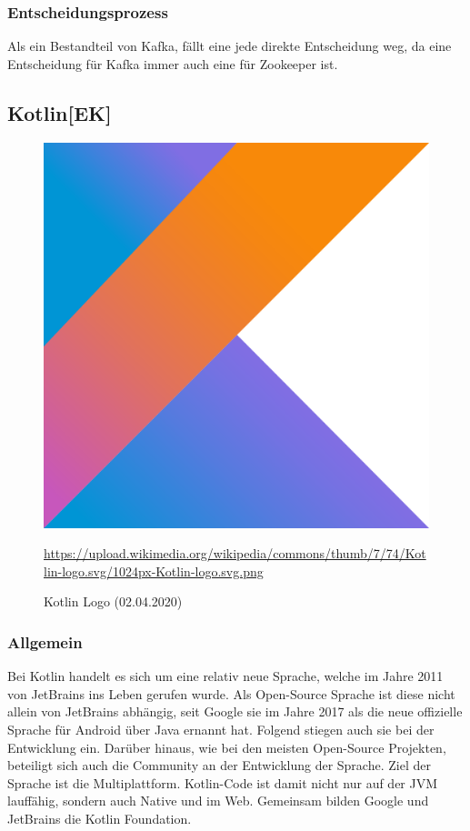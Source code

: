 \subsubsection{Entscheidungsprozess}
Als ein Bestandteil von Kafka, fällt eine jede direkte Entscheidung weg, da eine Entscheidung für Kafka immer auch eine für Zookeeper ist.

\subsection{Kotlin[EK]}
\begin{figure}[H]
    \centering
    \includegraphics[scale=0.1]{images/kotlin-logo.png}
    \caption{Kotlin Logo (02.04.2020)}
    \url{https://upload.wikimedia.org/wikipedia/commons/thumb/7/74/Kotlin-logo.svg/1024px-Kotlin-logo.svg.png}
\end{figure}
\subsubsection{Allgemein}
Bei Kotlin handelt es sich um eine relativ neue Sprache, welche im Jahre 2011 von JetBrains ins Leben gerufen wurde. Als Open-Source Sprache ist diese nicht allein von JetBrains abhängig, seit Google sie im Jahre 2017 als die neue offizielle Sprache für Android über Java ernannt hat. Folgend stiegen auch sie bei der Entwicklung ein. Darüber hinaus, wie bei den meisten Open-Source Projekten, beteiligt sich auch die Community an der Entwicklung der Sprache. Ziel der Sprache ist die Multiplattform. Kotlin-Code ist damit nicht nur auf der JVM lauffähig, sondern auch Native und im Web. Gemeinsam bilden Google und JetBrains die Kotlin Foundation.
